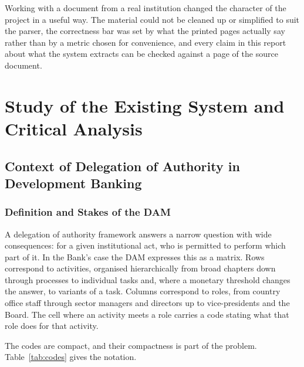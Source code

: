 Working with a document from a real institution changed the character of the project in a useful way. The material could not be cleaned up or simplified to suit the parser, the correctness bar was set by what the printed pages actually say rather than by a metric chosen for convenience, and every claim in this report about what the system extracts can be checked against a page of the source document.

\section{Study of the Existing System and Critical Analysis}

\subsection{Context of Delegation of Authority in Development Banking}

\subsubsection{Definition and Stakes of the DAM}

A delegation of authority framework answers a narrow question with wide consequences: for a given institutional act, who is permitted to perform which part of it. In the Bank's case the DAM expresses this as a matrix. Rows correspond to activities, organised hierarchically from broad chapters down through processes to individual tasks and, where a monetary threshold changes the answer, to variants of a task. Columns correspond to roles, from country office staff through sector managers and directors up to vice-presidents and the Board. The cell where an activity meets a role carries a code stating what that role does for that activity.

The codes are compact, and their compactness is part of the problem. Table~\ref{tab:codes} gives the notation.

